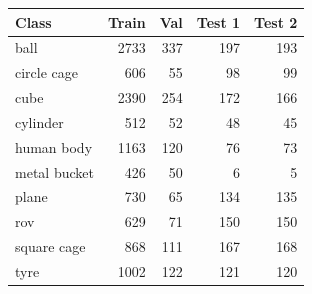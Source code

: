 \begin{tabular}{lrrrr}
\toprule
Class & Train & Val & Test 1 & Test 2 \\
\midrule
ball & 2733 & 337 & 197 & 193 \\
circle cage & 606 & 55 & 98 & 99 \\
cube & 2390 & 254 & 172 & 166 \\
cylinder & 512 & 52 & 48 & 45 \\
human body & 1163 & 120 & 76 & 73 \\
metal bucket & 426 & 50 & 6 & 5 \\
plane & 730 & 65 & 134 & 135 \\
rov & 629 & 71 & 150 & 150 \\
square cage & 868 & 111 & 167 & 168 \\
tyre & 1002 & 122 & 121 & 120 \\
\bottomrule
\end{tabular}
